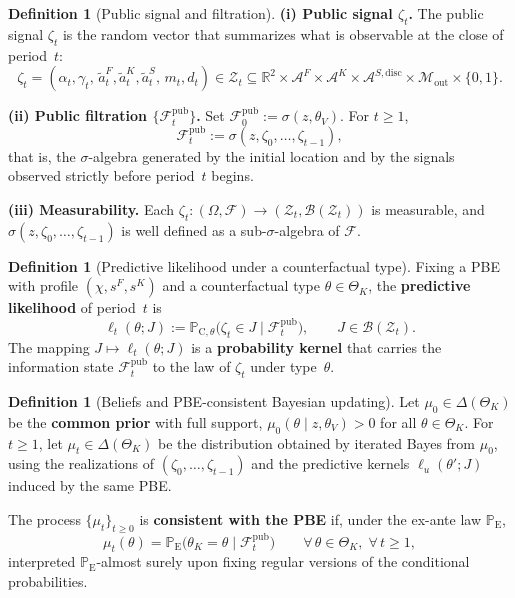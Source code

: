 \documentclass[12pt]{article}
\numberwithin{equation}{section}
\numberwithin{table}{section}
\theoremstyle{definition}
\newtheorem{definition}[theorem]{Definition}
\newcommand{\ProbE}{\mathbb{P}_{\mathrm{E}}}
\newcommand{\ProbC}[1]{\mathbb{P}_{\mathrm{C},#1}}
\begin{document}
\begin{definition}[Public signal and filtration]
\label{def:zeta-filtration}
\noindent\textbf{(i) Public signal $\zeta_t$.}
The public signal $\zeta_t$ is the random vector that summarizes what is
observable at the close of period~$t$:
\[
\zeta_t=(\alpha_t,\gamma_t,\,\tilde{a}_t^F,\tilde{a}_t^K,\tilde{a}_t^S,\,m_t,d_t)
\in
\mathcal{Z}_t\subseteq\mathbb{R}^2\times\mathcal{A}^F\times\mathcal{A}^K
\times\mathcal{A}^{S,\mathrm{disc}}\times\mathcal{M}_{\mathrm{out}}\times\{0,1\}.
\]

\noindent\textbf{(ii) Public filtration $\{\mathcal{F}_t^{\mathrm{pub}}\}$.}
Set $\mathcal{F}_0^{\mathrm{pub}}:=\sigma(z,\theta_V)$. For $t\ge 1$,
\[
\mathcal{F}_t^{\mathrm{pub}}:=\sigma(z,\zeta_0,\ldots,\zeta_{t-1}),
\]
that is, the $\sigma$-algebra generated by the initial location and by the
signals observed strictly before period~$t$ begins.

\noindent\textbf{(iii) Measurability.}
Each $\zeta_t:(\Omega,\mathcal{F})\to(\mathcal{Z}_t,\mathcal{B}(\mathcal{Z}_t))$
is measurable, and $\sigma(z,\zeta_0,\ldots,\zeta_{t-1})$ is well defined as a
sub-$\sigma$-algebra of $\mathcal{F}$.
\end{definition}

\bigskip

\begin{definition}[Predictive likelihood under a counterfactual type]
\label{def:predictive-likelihood}
Fixing a PBE with profile $(\chi,s^F,s^K)$ and a counterfactual type
$\theta\in\Theta_K$, the \textbf{predictive likelihood} of period~$t$ is
\begin{equation}
\label{eq:likelihood-zeta}
\ell_t(\theta;J)
:=\ProbC{\theta}\bigl(\zeta_t\in J\mid\mathcal{F}_t^{\mathrm{pub}}\bigr),
\qquad J\in\mathcal{B}(\mathcal{Z}_t).
\end{equation}
The mapping $J\mapsto\ell_t(\theta;J)$ is a \textbf{probability kernel} that
carries the information state $\mathcal{F}_t^{\mathrm{pub}}$ to the law of
$\zeta_t$ under type~$\theta$.
\end{definition}

\bigskip

\begin{definition}[Beliefs and PBE-consistent Bayesian updating]
\label{def:beliefs-martingale}
Let $\mu_0\in\Delta(\Theta_K)$ be the \textbf{common prior} with full support,
$\mu_0(\theta\mid z,\theta_V)>0$ for all $\theta\in\Theta_K$.
For $t\ge 1$, let $\mu_t\in\Delta(\Theta_K)$ be the distribution obtained by
iterated Bayes from $\mu_0$, using the realizations of
$(\zeta_0,\ldots,\zeta_{t-1})$ and the predictive kernels
$\ell_u(\theta';J)$ induced by the same PBE.

The process $\{\mu_t\}_{t\ge 0}$ is \textbf{consistent with the PBE} if, under
the ex-ante law $\ProbE$,
\begin{equation}
\label{eq:beliefs-ebp-consistency}
\mu_t(\theta)
=\ProbE\bigl(\theta_K=\theta\mid\mathcal{F}_t^{\mathrm{pub}}\bigr)
\qquad\forall\,\theta\in\Theta_K,\;\forall\,t\ge 1,
\end{equation}
interpreted $\ProbE$-almost surely upon fixing regular versions of the
conditional probabilities.
\end{definition}
\end{document}
